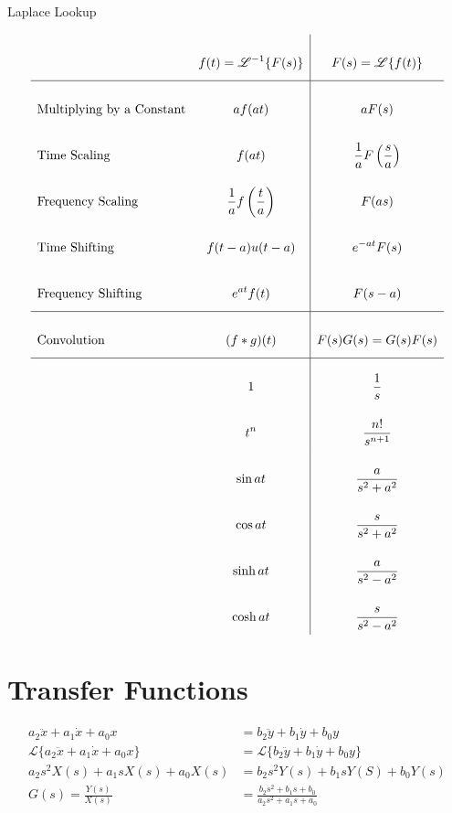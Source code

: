 \documentclass{article}
\begin{document}
    \begin{table}[h]
        \centering
        \caption{Laplace Lookup}
        $$\def\arraystretch{3}
        \begin{array}{>$l<$>{\displaystyle}c|>{\displaystyle}c}
            & f(t) = \mathscr{L}^{-1}\{F(s)\} & F(s) = \mathscr{L}\{f(t)\} \\
            \hline
            Multiplying by a Constant & af(at) & aF(s) \\
            Time Scaling & f(at) & \frac{1}{a}F\left(\frac{s}{a}\right) \\
            Frequency Scaling & \frac{1}{a}f\left(\frac{t}{a}\right) & F(as) \\
            Time Shifting & f(t - a)u(t - a) & e^{-at}F(s) \\
            Frequency Shifting & e^{at} f(t) & F(s - a) \\
            \hline
            Convolution & (f * g)(t) & F(s)G(s) = G(s)F(s) \\
            \hline
            & 1 & \frac{1}{s} \\
            & t^n & \frac{n!}{s^{n + 1}} \\
            & \sin{at} & \frac{a}{s^2 + a^2} \\
            & \cos{at} & \frac{s}{s^2 + a^2} \\
            & \sinh{at} & \frac{a}{s^2 - a^2} \\
            & \cosh{at} & \frac{s}{s^2 - a^2} \\
        \end{array}$$
    \end{table}

    \section{Transfer Functions}

    $$\begin{aligned}
        a_2\ddot{x} + a_1\dot{x} + a_0x &= b_2\ddot{y} + b_1\dot{y} + b_0y \\
        \mathscr{L}\{a_2\ddot{x} + a_1\dot{x} + a_0x\} &= \mathscr{L}\{b_2\ddot{y} + b_1\dot{y} + b_0y\} \\
        a_2s^2X(s) + a_1sX(s) + a_0X(s) &= b_2s^2Y(s) + b_1sY(S) + b_0Y(s) \\
        G(s) = \frac{Y(s)}{X(s)} &= \frac{b_2s^2 + b_1s + b_0}{a_2s^2 + a_1s + a_0} \\
    \end{aligned}$$
\end{document}
